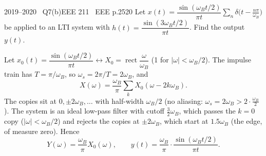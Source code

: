 \begin{qcard}{2019--2020 \textbullet\ Q7(b)}{EEE 211 \textbullet\ EEE p.25}{20}
Let $x(t)=\dfrac{\sin(\omega_Bt/2)}{\pi t}\sum_n\delta\big(t-\frac{n\pi}{\omega_B}\big)$ be applied to an LTI system with $h(t)=\dfrac{\sin(3\omega_Bt/2)}{\pi t}$. Find the output $y(t)$.
\end{qcard}
\begin{solution}
Let $x_0(t)=\dfrac{\sin(\omega_Bt/2)}{\pi t}\leftrightarrow X_0=\operatorname{rect}\dfrac{\omega}{\omega_B}$ (1 for $|\omega|<\omega_B/2$). The impulse train has $T=\pi/\omega_B$, so $\omega_s=2\pi/T=2\omega_B$, and
\[X(\omega)=\frac{\omega_B}{\pi}\sum_kX_0(\omega-2k\omega_B).\]
The copies sit at $0,\pm2\omega_B,\dots$ with half-width $\omega_B/2$ (no aliasing: $\omega_s=2\omega_B>2\cdot\frac{\omega_B}{2}$). The system is an ideal low-pass filter with cutoff $\frac32\omega_B$, which passes the $k=0$ copy ($|\omega|<\omega_B/2$) and rejects the copies at $\pm2\omega_B$, which start at $1.5\omega_B$ (the edge, of measure zero). Hence
\[Y(\omega)=\frac{\omega_B}{\pi}X_0(\omega),\qquad y(t)=\frac{\omega_B}{\pi}\cdot\frac{\sin(\omega_Bt/2)}{\pi t}.\]
\end{solution}
